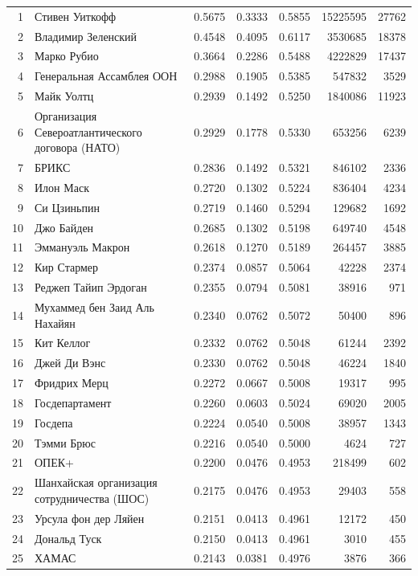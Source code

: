 {\begin{longtable}{r >{\raggedright\arraybackslash}p{4.2cm} S[table-format=1.4] S[table-format=1.4] S[table-format=1.4] r r}
1 & Стивен Уиткофф & 0.5675 & 0.3333 & 0.5855 & 15225595 & 27762 \\
2 & Владимир Зеленский & 0.4548 & 0.4095 & 0.6117 & 3530685 & 18378 \\
3 & Марко Рубио & 0.3664 & 0.2286 & 0.5488 & 4222829 & 17437 \\
4 & Генеральная Ассамблея ООН & 0.2988 & 0.1905 & 0.5385 & 547832 & 3529 \\
5 & Майк Уолтц & 0.2939 & 0.1492 & 0.5250 & 1840086 & 11923 \\
6 & Организация Североатлантического договора (НАТО) & 0.2929 & 0.1778 & 0.5330 & 653256 & 6239 \\
7 & БРИКС & 0.2836 & 0.1492 & 0.5321 & 846102 & 2336 \\
8 & Илон Маск & 0.2720 & 0.1302 & 0.5224 & 836404 & 4234 \\
9 & Си Цзиньпин & 0.2719 & 0.1460 & 0.5294 & 129682 & 1692 \\
10 & Джо Байден & 0.2685 & 0.1302 & 0.5198 & 649740 & 4548 \\
11 & Эммануэль Макрон & 0.2618 & 0.1270 & 0.5189 & 264457 & 3885 \\
12 & Кир Стармер & 0.2374 & 0.0857 & 0.5064 & 42228 & 2374 \\
13 & Реджеп Тайип Эрдоган & 0.2355 & 0.0794 & 0.5081 & 38916 & 971 \\
14 & Мухаммед бен Заид Аль Нахайян & 0.2340 & 0.0762 & 0.5072 & 50400 & 896 \\
15 & Кит Келлог & 0.2332 & 0.0762 & 0.5048 & 61244 & 2392 \\
16 & Джей Ди Вэнс & 0.2330 & 0.0762 & 0.5048 & 46224 & 1840 \\
17 & Фридрих Мерц & 0.2272 & 0.0667 & 0.5008 & 19317 & 995 \\
18 & Госдепартамент & 0.2260 & 0.0603 & 0.5024 & 69020 & 2005 \\
19 & Госдепа & 0.2224 & 0.0540 & 0.5008 & 38957 & 1343 \\
20 & Тэмми Брюс & 0.2216 & 0.0540 & 0.5000 & 4624 & 727 \\
21 & ОПЕК+ & 0.2200 & 0.0476 & 0.4953 & 218499 & 602 \\
22 & Шанхайская организация сотрудничества (ШОС) & 0.2175 & 0.0476 & 0.4953 & 29403 & 558 \\
23 & Урсула фон дер Ляйен & 0.2151 & 0.0413 & 0.4961 & 12172 & 450 \\
24 & Дональд Туск & 0.2150 & 0.0413 & 0.4961 & 3010 & 455 \\
25 & ХАМАС & 0.2143 & 0.0381 & 0.4976 & 3876 & 366 \\

\end{longtable}}
